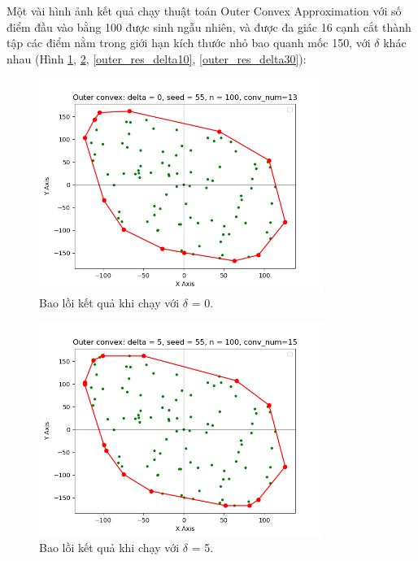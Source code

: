 \documentclass[12pt,a4paper,openany,oneside]{report}
\begin{document}
Một vài hình ảnh kết quả chạy thuật toán Outer Convex Approximation với số điểm đầu vào bằng 100 được sinh ngẫu nhiên, và được đa giác 16 cạnh cắt thành tập các điểm nằm trong giới hạn kích thước nhỏ bao quanh mốc 150, với $\delta$ khác nhau (Hình \ref{outer_res_delta0}, \ref{outer_res_delta5}, \ref{outer_res_delta10}, \ref{outer_res_delta30}):
\begin{figure}[ht!]
	\begin{center}
		\includegraphics[width=350px]{./outer_res_delta0.png}
		\caption{Bao lồi kết quả khi chạy với $\delta$ = 0.}
		\label{outer_res_delta0}
	\end{center}
\end{figure} 	
\begin{figure}[ht!]
	\begin{center}
		\includegraphics[width=350px]{./outer_res_delta5.png}
		\caption{Bao lồi kết quả khi chạy với $\delta$ = 5.}
		\label{outer_res_delta5}
	\end{center}
\end{figure} 	
\end{document}
